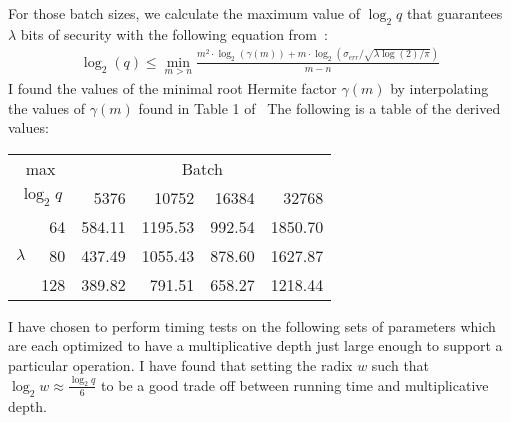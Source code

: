 \documentclass{article}
\begin{document}
        For those batch sizes, 
        we calculate the maximum value of $\log_2{q}$ that guarantees
        $\lambda$ bits of security with the following equation from~\cite{comparison}:
        \begin{align}
            \log_2(q) 
            \leq \min_{m> n}
            \frac{
                m^2\cdot\log_2(\gamma(m)) 
                + m\cdot
                \log_2\left(
                    \sigma_{err}
                    /
                    \sqrt{\lambda\log(2)/\pi}
                \right)
            }{
                m - n
            }
        \end{align}
        I found the values of the minimal root Hermite factor $\gamma(m)$ by interpolating the values of
        $\gamma(m)$ found in Table 1 of~\cite{comparison}
        The following is a table of the derived values:

        \begin{center}
            \begin{tabular}{| r | r || r | r | r | r |}
                \cline{3-6}
                \multicolumn{2}{c||}{max}
                & \multicolumn{4}{|c|}{Batch}
                \\ 
                \cline{3-6}
                \cline{3-6}
                \multicolumn{2}{c||}{$\log_2q$}
                     & 5376  & 10752 & 16384 & 32768 
                \\ \hline\hline
                \multirow{3}{*}{$\lambda$} & 64  & 584.11 & 1195.53 & 992.54 & 1850.70
                \\ \cline{2-6}
                & 80   & 437.49 & 1055.43 & 878.60 & 1627.87
                \\ \cline{2-6}
                & 128  & 389.82 &  791.51 & 658.27 & 1218.44
                \\ \hline
            \end{tabular}
        \end{center}

        I have chosen to perform timing tests on the following
        sets of parameters which are each optimized to have a
        multiplicative depth just large enough to support a particular operation.
        I have found that setting the radix $w$ such that
        $\log_2 w \approx \frac{\log_2 q}{6}$ to be a good trade off
        between running time and multiplicative depth.
\end{document}
